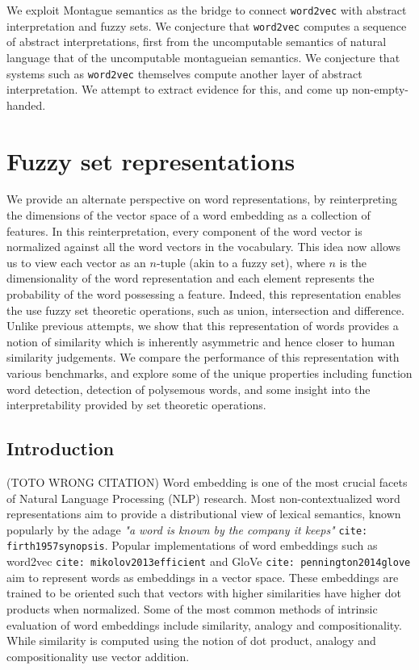 \documentclass[11pt]{book}
\newcommand{\citep}[1]{\texttt{cite: #1}}
\begin{document}
We exploit Montague semantics as the bridge to connect \texttt{word2vec} with abstract interpretation and fuzzy sets. We conjecture that \texttt{word2vec} 
computes a sequence of abstract interpretations, first from the uncomputable semantics of natural language that of the uncomputable montagueian semantics. We conjecture that systems such as \texttt{word2vec} themselves compute another layer of abstract interpretation. We attempt to extract evidence for this, and come up non-empty-handed.


\chapter{Fuzzy set representations}
\label{chapter:fuzzy-set-representation}

We provide an alternate perspective on word representations, by
reinterpreting the dimensions of the vector space of a word embedding as a
collection of features. In this reinterpretation, every component of the word
vector is normalized against all the word vectors in the vocabulary. This idea
now allows us to view each vector as an $n$-tuple (akin to a fuzzy set), where
$n$ is the dimensionality of the word representation and each element
represents the probability of the word possessing a feature. Indeed, this
representation enables the use fuzzy set theoretic operations, such as union,
intersection and difference. Unlike previous attempts, we show that this
representation of words provides a notion of similarity which is inherently
asymmetric and hence closer to human similarity judgements. We compare the
performance of this representation with various benchmarks, and explore some of
the unique properties including function word detection, detection of
polysemous words, and some insight into the interpretability provided by set
theoretic operations.

\section{Introduction} \label{sec: intro}

(TOTO \cite{levy2012call} WRONG CITATION)
Word embedding is one of the most crucial facets of Natural Language Processing
(NLP) research. Most non-contextualized word representations aim to provide a
distributional view of lexical semantics, known popularly by the adage
\textit{"a word is known by the company it keeps"} \citep{firth1957synopsis}.
Popular implementations of word embeddings such as word2vec
\citep{mikolov2013efficient} and GloVe \citep{pennington2014glove} aim to
represent words as embeddings in a vector space. These embeddings are trained
to be oriented such that vectors with higher similarities have higher dot
products when normalized. Some of the most common methods of intrinsic
evaluation of word embeddings include similarity, analogy and compositionality.
While similarity is computed using the notion of dot product, analogy and
compositionality use vector addition.
\end{document}
